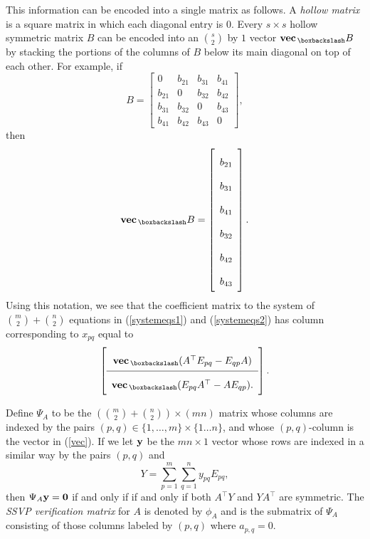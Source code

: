 \documentclass[preprint,12pt]{elsarticle}
\newcommand{\trans  }{^\top}
\newcommand{\lexvec}{\textrm{\bf vec}_{\,\boxbackslash}}
\begin{document}
This information can be encoded into a single matrix as follows.
A {\it  hollow matrix} is a square matrix in which each diagonal entry is $0$.
Every $s \times s$ hollow symmetric matrix $B$
can be encoded into an $\binom{s}{2}$ by $1$ vector $\lexvec{B}$  by stacking the portions of the columns of $B$ below its main diagonal on top of each other. 
For example, if  
\[ 
B= \left[ \begin{array}{cccc}
0 & b_{21} & b_{31} & b_{41} \\
b_{21} & 0 & b_{32} & b_{42}\\
b_{31} & b_{32} & 0 & b_{43} \\
b_{41}& b_{42} & b_{43} & 0 
\end{array} \right],
\]
then 
\[ 
\lexvec{B}= 
\left[ \begin{array}{c}
b_{21}\\
b_{31}\\
b_{41} \\
b_{32} \\
b_{42} \\
b_{43}
\end{array} 
\right] .
\]
Using this notation, we see that the coefficient matrix to the system of $\binom{m}{2}+ \binom{n}{2}$ equations in 
(\ref{systemeqs1}) and (\ref{systemeqs2}) has column corresponding to $x_{pq}$ equal to
\begin{equation}
\renewcommand*{\arraystretch}{2}
\label{vec}
 \left[  \begin{array}{c} 
\lexvec (A\trans E_{pq} - E_{qp}A)
\\ \hline 
\lexvec( E_{pq}A\trans - AE_{qp}).
\end{array} \right] .
\end{equation}

Define $\Psi_A$ to be the $(\binom{m}{2} + \binom{n}{2}) \times (mn)$ matrix 
whose columns are indexed by the pairs $(p,q) \in \{1,\ldots, m\}\times \{1\ldots n\}$, and whose 
$(p,q)$-column is the vector in (\ref{vec}).  If we  let $\bf y$ be the $mn \times 1$ vector 
whose rows are indexed in a similar way by the pairs $(p,q)$ and 
\begin{equation}
\label{equation}    
Y=\sum_{p=1}^m \sum_{q=1}^n y_{pq} E_{pq},
\end{equation}
then 
$\Psi_A \bf y={\mathbf 0} $ if and only if 
if and only if both $A\trans Y$ and $YA\trans$ are symmetric. The \textit{SSVP verification matrix} for $A$ is denoted by $\phi_A$ and is the submatrix of $\Psi_A$ consisting of those columns labeled by $(p,q)$
where $a_{p,q} = 0$. 
\end{document}

